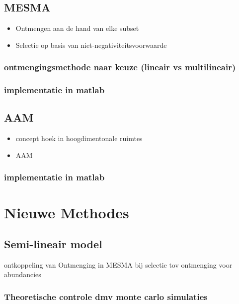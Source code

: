 \documentclass[12pt]{report}
\begin{document}
\section{MESMA}

\begin{itemize}
\item Ontmengen aan de hand van elke subset
\item Selectie op basis van niet-negativiteitsvoorwaarde
\end{itemize}

\subsection{ontmengingsmethode naar keuze (lineair vs multilineair)}

\subsection{implementatie in matlab}

\section{AAM}

\begin{itemize}
\item concept hoek in hoogdimentonale ruimtes
\item AAM
\end{itemize}

\subsection{implementatie in matlab}


\chapter{Nieuwe Methodes}

\section{Semi-lineair model}

ontkoppeling van Ontmenging in MESMA bij selectie tov ontmenging voor abundancies

\subsection{Theoretische controle dmv monte carlo simulaties}
\end{document}
